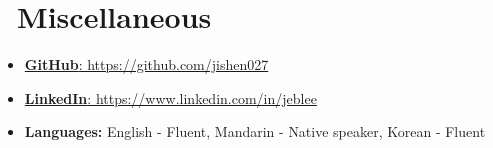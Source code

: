 \documentclass{resume}
\begin{document}
\section{\faInfo\ Miscellaneous}
\begin{itemize}[parsep=0.5ex]
  \item \href{https://github.com/jishen027}{\textbf{GitHub}: https://github.com/jishen027}
  \item \href{https://www.linkedin.com/in/jeblee}{\textbf{LinkedIn}: https://www.linkedin.com/in/jeblee} 
  \item \textbf{Languages:} English - Fluent, Mandarin - Native speaker, Korean - Fluent
\end{itemize}


%
%
\end{document}
